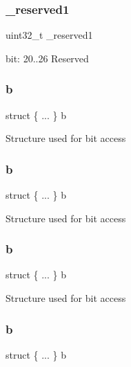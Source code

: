 \subsubsection{\texorpdfstring{\_reserved1}{\_reserved1}}
{\footnotesize\ttfamily uint32\+\_\+t \+\_\+reserved1}

bit\+: 20..26 Reserved \mbox{\label{union_a_p_s_r___type_acd7ff63a8cd9c5e58636027fd0d4abce}} 
\subsubsection{\texorpdfstring{b}{b}\hspace{0.1cm}{\footnotesize\ttfamily [1/4]}}
{\footnotesize\ttfamily struct \{ ... \}   b}

Structure used for bit access \mbox{\label{union_a_p_s_r___type_ae76e72348ad0deba5d762ba382059fa6}} 
\subsubsection{\texorpdfstring{b}{b}\hspace{0.1cm}{\footnotesize\ttfamily [2/4]}}
{\footnotesize\ttfamily struct \{ ... \}   b}

Structure used for bit access \mbox{\label{union_a_p_s_r___type_a1611cae6e74a7581fbca5c223e7290c9}} 
\subsubsection{\texorpdfstring{b}{b}\hspace{0.1cm}{\footnotesize\ttfamily [3/4]}}
{\footnotesize\ttfamily struct \{ ... \}   b}

Structure used for bit access \mbox{\label{union_a_p_s_r___type_a2e5b85cff450c7f92c7388dd09f10065}} 
\subsubsection{\texorpdfstring{b}{b}\hspace{0.1cm}{\footnotesize\ttfamily [4/4]}}
{\footnotesize\ttfamily struct \{ ... \}   b}

